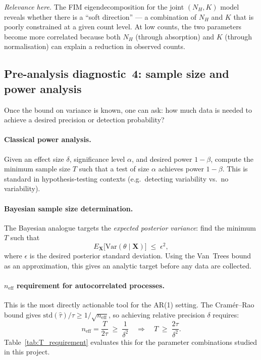 \documentclass[11pt, a4paper]{article}
\begin{document}
\noindent\textit{Relevance here.}
The FIM eigendecomposition for the joint $(N_H, K)$ model reveals whether there
is a ``soft direction'' --- a combination of $N_H$ and $K$ that is poorly
constrained at a given count level.
At low counts, the two parameters become more correlated because both $N_H$
(through absorption) and $K$ (through normalisation) can explain a reduction
in observed counts.

\subsection*{Pre-analysis diagnostic~4: sample size and power analysis}
\label{sec:power}

Once the bound on variance is known, one can ask: how much data is needed to
achieve a desired precision or detection probability?

\paragraph{Classical power analysis.}
Given an effect size $\delta$, significance level $\alpha$, and desired power
$1-\beta$, compute the minimum sample size $T$ such that a test of size $\alpha$
achieves power $1-\beta$.
This is standard in hypothesis-testing contexts (e.g.\ detecting variability
vs.\ no variability).

\paragraph{Bayesian sample size determination.}
The Bayesian analogue targets the \emph{expected posterior variance}:
find the minimum $T$ such that
\begin{equation}
    E_{\mathbf{X}}\bigl[\mathrm{Var}(\theta \mid \mathbf{X})\bigr]
    \;\leq\; \epsilon^2,
\end{equation}
where $\epsilon$ is the desired posterior standard deviation.
Using the Van~Trees bound as an approximation, this gives an analytic target
before any data are collected.

\paragraph{$n_\mathrm{eff}$ requirement for autocorrelated processes.}
This is the most directly actionable tool for the AR(1) setting.
The Cram\'er--Rao bound gives $\mathrm{std}(\hat\tau)/\tau \geq 1/\sqrt{n_\mathrm{eff}}$,
so achieving relative precision $\delta$ requires:
\begin{equation}
    n_\mathrm{eff} = \frac{T}{2\tau} \;\geq\; \frac{1}{\delta^2}
    \quad\Longrightarrow\quad
    T \;\geq\; \frac{2\tau}{\delta^2}.
    \label{eq:T_requirement}
\end{equation}
Table~\ref{tab:T_requirement} evaluates this for the parameter combinations
studied in this project.
\end{document}
